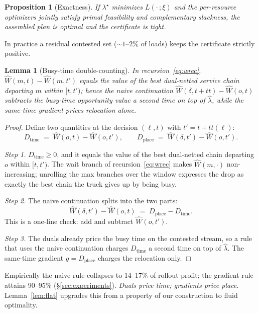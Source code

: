 \documentclass[11pt]{article}
\newtheorem{lemma}{Lemma}
\newtheorem{proposition}{Proposition}
\begin{document}
\begin{proposition}[Exactness]
\label{prop:exact}
If $\lambda^{\star}$ minimizes $L(\cdot\,; \xi)$ and the per-resource
optimizers jointly satisfy primal feasibility and complementary
slackness, the assembled plan is optimal and the certificate is tight.
\end{proposition}

In practice a residual contested set (${\sim}1$--$2\%$ of loads) keeps
the certificate strictly positive.

\begin{lemma}[Busy-time double-counting]
\label{lem:doublecount}
In recursion~\eqref{eq:wrec}, $\widehat{W}(m, t) - \widehat{W}(m, t')$
equals the value of the best dual-netted service chain departing $m$
within $[t, t')$; hence the naive continuation
$\widehat{W}(\delta, t{+}tt) - \widehat{W}(o, t)$ subtracts the
busy-time opportunity value a second time on top of $\hat{\lambda}$,
while the same-time gradient prices relocation alone.
\end{lemma}

\begin{proof}
Define two quantities at the decision $(\ell, t)$ with
$t' = t + tt(\ell)$:
\[
  D_{\mathrm{time}} \;=\; \widehat{W}(o, t) - \widehat{W}(o, t'),
  \qquad
  D_{\mathrm{place}} \;=\; \widehat{W}(\delta, t') - \widehat{W}(o, t').
\]

\emph{Step 1.} $D_{\mathrm{time}} \geq 0$, and it equals the value of
the best dual-netted chain departing $o$ within $[t, t')$. The wait
branch of recursion~\eqref{eq:wrec} makes $\widehat{W}(m, \cdot)$
non-increasing; unrolling the max branches over the window expresses
the drop as exactly the best chain the truck gives up by being busy.

\emph{Step 2.} The naive continuation splits into the two parts:
\[
  \widehat{W}(\delta, t') - \widehat{W}(o, t)
  \;=\; D_{\mathrm{place}} - D_{\mathrm{time}}.
\]
This is a one-line check: add and subtract $\widehat{W}(o, t')$.

\emph{Step 3.} The duals already price the busy time on the contested
stream, so a rule that uses the naive continuation charges
$D_{\mathrm{time}}$ a second time on top of $\hat{\lambda}$. The
same-time gradient $g = D_{\mathrm{place}}$ charges the relocation
only.
\end{proof}

Empirically the naive rule collapses to 14--17\% of rollout profit; the
gradient rule attains 90--95\% (\S\ref{sec:experiments}). \emph{Duals
price time; gradients price place.} Lemma~\ref{lem:flat} upgrades this
from a property of our construction to fluid optimality.
\end{document}
